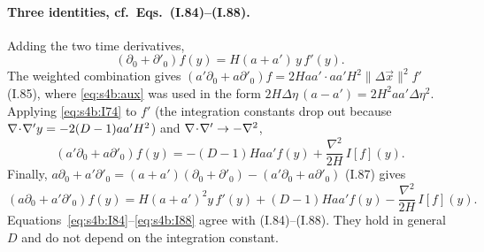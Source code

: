\documentclass[aps,prd,onecolumn,10pt,nofootinbib,floatfix]{revtex4-2}
\newcommand{\eqI}[1]{(I.#1)}
\begin{document}
\paragraph*{Three identities, cf.\ Eqs.~(I.84)--(I.88).}
Adding the two time derivatives,
\begin{equation}
(\partial_0+\partial'_0)f(y)=H(a+a')\,y\,f'(y).
\label{eq:s4b:I84}
\end{equation}
The weighted combination gives $(a'\partial_0+a\partial'_0)f=2Haa'\cdot aa'H^2\|\Delta\vec x\|^2f'$ \eqI{85}, where
\eqref{eq:s4b:aux} was used in the form $2H\Delta\eta\,(a-a')=2H^2aa'\Delta\eta^2$. Applying \eqref{eq:s4b:I74} to $f'$
(the integration constants drop out because $\nabla\!\cdot\!\nabla' y=-2(D-1)aa'H^2$) and $\nabla\!\cdot\!\nabla'\to-\nabla^2$,
\begin{equation}
(a'\partial_0+a\partial'_0)f(y)=-(D-1)Haa'f(y)+\frac{\nabla^2}{2H}\,I[f](y).
\label{eq:s4b:I86}
\end{equation}
Finally, $a\partial_0+a'\partial'_0=(a+a')(\partial_0+\partial'_0)-(a'\partial_0+a\partial'_0)$ \eqI{87} gives
\begin{equation}
(a\partial_0+a'\partial'_0)f(y)=H(a+a')^2y\,f'(y)+(D-1)Haa'f(y)-\frac{\nabla^2}{2H}\,I[f](y).
\label{eq:s4b:I88}
\end{equation}
Equations~\eqref{eq:s4b:I84}--\eqref{eq:s4b:I88} agree with \eqI{84}--\eqI{88}. They hold in general $D$ and do not depend on
the integration constant.
\end{document}
